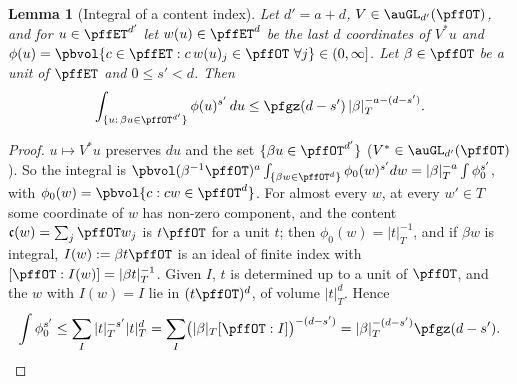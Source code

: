 \documentclass[10pt]{amsart}
\newtheorem{lemma}[theorem]{Lemma}
\theoremstyle{definition}
\theoremstyle{remark}
\begin{document}
\begin{lemma}[Integral of a content index]\label{pfg:content}
Let $d'=a+d$, $V\in\auGL_{d'}(\pffOT)$, and for $u\in\pffET^{d'}$ let $w(u)\in\pffET^d$ be the last $d$ coordinates of
$V^*u$ and $\phi(u)=\pbvol\{c\in\pffET:c\,w(u)_j\in\pffOT\ \forall j\}\in(0,\infty]$. Let $\beta\in\pffOT$ be a unit of
$\pffET$ and $0\le s'<d$. Then
\[
\int_{\{u:\,\beta u\in\pffOT^{d'}\}}\phi(u)^{s'}\,du\le\pfgz(d-s')\,|\beta|_T^{-a-(d-s')} .
\]
\end{lemma}
\begin{proof}
$u\mapsto V^*u$ preserves $du$ and the set $\{\beta u\in\pffOT^{d'}\}$ ($V^*\in\auGL_{d'}(\pffOT)$). So the integral is
$\pbvol(\beta^{-1}\pffOT)^a\allowbreak \int_{\{\beta w\in\pffOT^d\}}\phi_0(w)^{s'}dw=|\beta|_T^{-a}\int\phi_0^{s'}$, with
$\phi_0(w)=\pbvol\{c:cw\in\pffOT^d\}$. For almost every $w$, at every $w'\in T$ some coordinate of $w$ has non-zero
component, and the content $\mathfrak c(w)=\sum_j\pffOT w_j$ is $t\pffOT$ for a unit $t$; then $\phi_0(w)=|t|_T^{-1}$, and if
$\beta w$ is integral, $I(w):=\beta t\pffOT$ is an ideal of finite index with $[\pffOT:I(w)]=|\beta t|_T^{-1}$. Given $I$,
$t$ is determined up to a unit of $\pffOT$, and the $w$ with $I(w)=I$ lie in $(t\pffOT)^d$, of volume $|t|_T^d$. Hence
\[
\int\phi_0^{s'}\le\sum_I|t|_T^{-s'}|t|_T^{d}=\sum_I\bigl(|\beta|_T[\pffOT:I]\bigr)^{-(d-s')}=|\beta|_T^{-(d-s')}\pfgz(d-s').\qedhere
\]
\end{proof}
\end{document}
